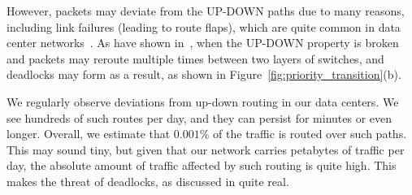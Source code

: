 
However, packets may deviate from the UP-DOWN paths due to many reasons,
including link failures (leading to route flaps), which are quite common in data
center networks~\cite{netpilot,f10}.  As have shown
in~\cite{shpiner2016unlocking}, when the UP-DOWN property is broken and packets
may reroute multiple times between two layers of switches, and deadlocks may
form as a result, as shown in Figure~\ref{fig:priority_transition}(b).

We regularly observe deviations from up-down routing in our data centers.  We
see hundreds of such routes per day, and they can persist for minutes or even
longer. Overall, we estimate that $0.001\%$ of the traffic is routed over such
paths. This may sound tiny, but given that our network carries petabytes of
traffic per day, the absolute amount of traffic affected by such routing is
quite high. This makes the threat of deadlocks, as discussed
in\cite{rdmaatscale,shpiner2016unlocking,hu2016deadlocks} quite real.


